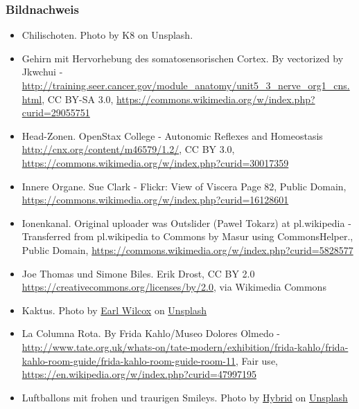 \documentclass{beamer}
\begin{document}
\begin{frame}
 
\frametitle{Bildnachweis}
 
\begin{tiny}
  

\begin{itemize}

\item
Chilischoten. Photo by K8 on Unsplash. 

\item
Gehirn mit Hervorhebung des somatosensorischen Cortex. By vectorized by Jkwchui - \url{http://training.seer.cancer.gov/module_anatomy/unit5_3_nerve_org1_cns.html}, CC BY-SA 3.0, \url{https://commons.wikimedia.org/w/index.php?curid=29055751}

\item
Head-Zonen. OpenStax College - Autonomic Reflexes and Homeostasis  \url{http://cnx.org/content/m46579/1.2/}, CC BY 3.0, \url{https://commons.wikimedia.org/w/index.php?curid=30017359}

\item
Innere Organe.  Sue Clark - Flickr: View of Viscera Page 82, Public Domain, \url{https://commons.wikimedia.org/w/index.php?curid=16128601}

\item
Ionenkanal.  Original uploader was Outslider (Paweł Tokarz) at pl.wikipedia - Transferred from pl.wikipedia to Commons by Masur using CommonsHelper., Public Domain, \url{https://commons.wikimedia.org/w/index.php?curid=5828577}
\item
Joe Thomas und Simone Biles. Erik Drost, CC BY 2.0 \url{https://creativecommons.org/licenses/by/2.0}, via Wikimedia Commons

\item
Kaktus. Photo by \href{https://unsplash.com/@earl_plannerzone?utm_source=unsplash&utm_medium=referral&utm_content=creditCopyText}{Earl Wilcox} on \href{https://unsplash.com/s/photos/pain?utm_source=unsplash&utm_medium=referral&utm_content=creditCopyText}{Unsplash}

\item
La Columna Rota. By Frida Kahlo/Museo Dolores Olmedo - \url{http://www.tate.org.uk/whats-on/tate-modern/exhibition/frida-kahlo/frida-kahlo-room-guide/frida-kahlo-room-guide-room-11}, Fair use, \url{https://en.wikipedia.org/w/index.php?curid=47997195}


\item
Luftballons mit frohen und traurigen Smileys. Photo by \href{https://unsplash.com/@artbyhybrid?utm_source=unsplash&utm_medium=referral&utm_content=creditCopyText}{Hybrid} on \href{https://unsplash.com/s/photos/feedback?utm_source=unsplash&utm_medium=referral&utm_content=creditCopyText}{Unsplash}

\end{itemize}
\end{tiny}

\end{frame}
\end{document}
